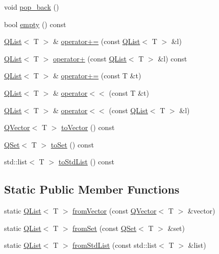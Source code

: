 \begin{DoxyCompactItemize}
void \hyperlink{class_q_list_adb1888f063a883ecc656a1daf0347a79}{pop\+\_\+back} ()
\item 
bool \hyperlink{class_q_list_af93da7b266824a11caae7cd3e5900d30}{empty} () const 
\item 
\hyperlink{class_q_list}{Q\+List}$<$ T $>$ \& \hyperlink{class_q_list_a6f36674c5ad943e3a23cfc73c0a2fee1}{operator+=} (const \hyperlink{class_q_list}{Q\+List}$<$ T $>$ \&l)
\item 
\hyperlink{class_q_list}{Q\+List}$<$ T $>$ \hyperlink{class_q_list_a7ed66a2541edf55b0ea33778778ee6c0}{operator+} (const \hyperlink{class_q_list}{Q\+List}$<$ T $>$ \&l) const 
\item 
\hyperlink{class_q_list}{Q\+List}$<$ T $>$ \& \hyperlink{class_q_list_a63856d5ed93fdf5e9f6c188415d81839}{operator+=} (const T \&t)
\item 
\hyperlink{class_q_list}{Q\+List}$<$ T $>$ \& \hyperlink{class_q_list_ac2346b83b0fce8b70836bd7a660ec346}{operator$<$$<$} (const T \&t)
\item 
\hyperlink{class_q_list}{Q\+List}$<$ T $>$ \& \hyperlink{class_q_list_a902fc01867da3047603546e10bb102e6}{operator$<$$<$} (const \hyperlink{class_q_list}{Q\+List}$<$ T $>$ \&l)
\item 
\hyperlink{class_q_vector}{Q\+Vector}$<$ T $>$ \hyperlink{class_q_list_a2cd704f6f4c066e501e170fd8c11cf28}{to\+Vector} () const 
\item 
\hyperlink{class_q_set}{Q\+Set}$<$ T $>$ \hyperlink{class_q_list_af534f77fa45d1f5c70bae4fcb1341803}{to\+Set} () const 
\item 
std\+::list$<$ T $>$ \hyperlink{class_q_list_a4da73cbb34b8ace233ec93eacc6ddb79}{to\+Std\+List} () const 
\end{DoxyCompactItemize}
\subsection*{Static Public Member Functions}
\begin{DoxyCompactItemize}
\item 
static \hyperlink{class_q_list}{Q\+List}$<$ T $>$ \hyperlink{class_q_list_ac9f7e64d962222b0660e51adbd128ef7}{from\+Vector} (const \hyperlink{class_q_vector}{Q\+Vector}$<$ T $>$ \&vector)
\item 
static \hyperlink{class_q_list}{Q\+List}$<$ T $>$ \hyperlink{class_q_list_a11d8c4df34e11f1f5539ea37f3d2130b}{from\+Set} (const \hyperlink{class_q_set}{Q\+Set}$<$ T $>$ \&set)
\item 
static \hyperlink{class_q_list}{Q\+List}$<$ T $>$ \hyperlink{class_q_list_af0810b38261117b3616803519d825c9c}{from\+Std\+List} (const std\+::list$<$ T $>$ \&list)
\end{DoxyCompactItemize}
